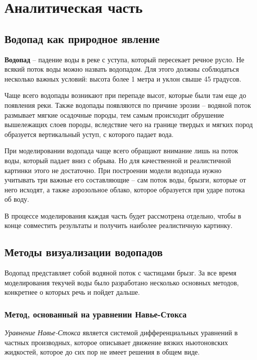 \chapter{Аналитическая часть}

\section{Водопад как природное явление}

\textbf{Водопад} -- падение воды в реке с уступа, который пересекает речное русло. Не всякий поток воды можно назвать водопадом. Для этого должны соблюдаться несколько важных условий: высота более 1 метра и уклон свыше 45 градусов. 


Чаще всего водопады возникают при перепаде высот, которые были там еще до появления реки. 
Также водопады появляются по причине эрозии -- водяной поток размывает мягкие осадочные породы, тем самым происходит обрушение вышележащих слоев породы, вследствие чего на границе твердых и мягких пород образуется вертикальный уступ, с которого падает вода.

При моделировании водопада чаще всего обращают внимание лишь на поток воды, который падает вниз с обрыва. Но для качественной и реалистичной картинки этого не достаточно. При построении модели водопада нужно учитывать три важные его составляющие -- сам поток воды, брызги, которые от него исходят, а также аэрозольное облако, которое образуется при ударе потока об воду.

В процессе моделирования каждая часть будет рассмотрена отдельно, чтобы в конце совместить результаты и получить наиболее реалистичную картинку.


\section{Методы визуализации водопадов}

Водопад представляет собой водяной поток с частицами брызг. За все время моделирования текучей воды было разработано несколько основных методов, конкретнее о которых речь и пойдет дальше.


\subsection{Метод, основанный на уравнении Навье-Стокса}

\textit{Уравнение Навье-Стокса} \cite{navier-stokes} является системой дифференциальных уравнений в частных производных, которое описывает движение вязких ньютоновских жидкостей, которое до сих пор не имеет решения в общем виде. 

